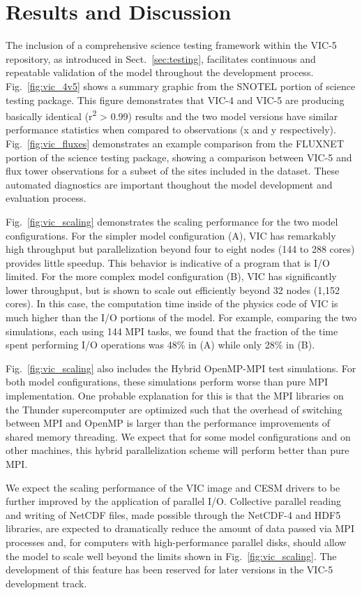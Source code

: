 \documentclass[gmd, manuscript]{copernicus}
\begin{document}
\section{Results and Discussion}
  \label{sec:results}
  The inclusion of a comprehensive science testing framework within the VIC-5 repository, as introduced in Sect.~\ref{sec:testing}, facilitates continuous and repeatable validation of the model throughout the development process. Fig.~\ref{fig:vic_4v5} shows a summary graphic from the SNOTEL portion of science testing package. This figure demonstrates that VIC-4 and VIC-5 are producing basically identical (r\textsuperscript{2} > 0.99) results and the two model versions have similar performance statistics when compared to observations (x and y respectively). Fig.~\ref{fig:vic_fluxes} demonstrates an example comparison from the FLUXNET portion of the science testing package, showing a comparison between VIC-5 and flux tower observations for a subset of the sites included in the dataset. These automated diagnostics are important thoughout the model development and evaluation process.

  Fig.~\ref{fig:vic_scaling} demonstrates the scaling performance for the two model configurations. For the simpler model configuration (A), VIC has remarkably high throughput but parallelization beyond four to eight nodes (144 to 288 cores) provides little speedup. This behavior is indicative of a program that is I/O limited. For the more complex model configuration (B), VIC has significantly lower throughput, but is shown to scale out efficiently beyond 32 nodes (1,152 cores). In this case, the computation time inside of the physics code of VIC is much higher than the I/O portions of the model. For example, comparing the two simulations, each using 144 MPI tasks, we found that the fraction of the time spent performing I/O operations was 48\% in (A) while only 28\% in (B).

  Fig.~\ref{fig:vic_scaling} also includes the Hybrid OpenMP-MPI test simulations. For both model configurations, these simulations perform worse than pure MPI implementation. One probable explanation for this is that the MPI libraries on the Thunder supercomputer are optimized such that the overhead of switching between MPI and OpenMP is larger than the performance improvements of shared memory threading. We expect that for some model configurations and on other machines, this hybrid parallelization scheme will perform better than pure MPI.

  We expect the scaling performance of the VIC image and CESM drivers to be further improved by the application of parallel I/O. Collective parallel reading and writing of NetCDF files, made possible through the NetCDF-4 and HDF5 libraries, are expected to dramatically reduce the amount of data passed via MPI processes and, for computers with high-performance parallel disks, should allow the model to scale well beyond the limits shown in Fig.~\ref{fig:vic_scaling}. The development of this feature has been reserved for later versions in the VIC-5 development track.
\end{document}
